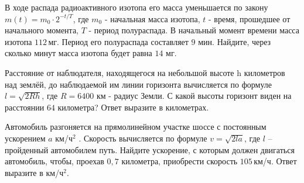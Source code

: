 \begin{homework}[number=2]
\begin{listofex}
\begin{minipage}[c]{0.1\textwidth}
		\end{minipage}
		\item В ходе распада радиоактивного изотопа его масса уменьшается по закону \( m(t)=m_0\cdot2^{-t/T} \), где \( m_0 \) - начальная масса изотопа,  \( t \) - время, прошедшее от начального момента, \( T \) - период полураспада. В начальный момент времени масса изотопа \( 112 \) мг. Период его полураспада составляет \( 9  \) мин. Найдите, через сколько минут масса изотопа будет равна \( 14  \) мг.
		\item Расстояние от наблюдателя, находящегося на небольшой высоте  h километров над землёй, до наблюдаемой им линии горизонта вычисляется по формуле \( l=\sqrt{2Rh} \), где \( R=6400 \) км - радиус Земли. С какой высоты горизонт виден на расстоянии \( 64 \) километра? Ответ выразите в километрах.
		\newpage
		\item Автомобиль разгоняется на прямолинейном участке шоссе с постоянным ускорением \( a \) км/ч\( ^2 \) . Скорость вычисляется по формуле \( v=\sqrt{2la} \), где \( l \) -- пройденный автомобилем путь. Найдите ускорение, с которым должен двигаться автомобиль, чтобы, проехав \( 0,7 \) километра, приобрести скорость \( 105 \) км/ч. Ответ выразите в км/ч\( ^2 \).
		\item {}
		\item {}
		\item {}
		\item {}
		\newpage
		\item 
	\end{listofex}
	\newpage
\end{homework}
\newpage
%
